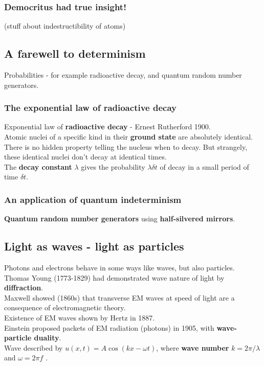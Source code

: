 \documentclass{article}
\begin{document}
\subsubsection{Democritus had true insight!}
(stuff about indestructibility of atoms)

\subsection{A farewell to determinism}
Probabilities - for example radioactive decay, and quantum random number generators.\\
\subsubsection{The exponential law of radioactive decay}
Exponential law of \textbf{radioactive decay} - Ernest Rutherford 1900.\\
Atomic nuclei of a specific kind in their \textbf{ground state} are absolutely identical. There is no hidden property telling the nucleus when to decay. But strangely, these identical nuclei don't decay at identical times.\\
The \textbf{decay constant} $\lambda$ gives the probability $\lambda \delta t$ of decay in a small period of time $\delta t$. \\
\subsubsection{An application of quantum indeterminism}
\textbf{Quantum random number generators} using \textbf{half-silvered mirrors}.

\subsection{Light as waves - light as particles}
Photons and electrons behave in some ways like waves, but also particles.\\
Thomas Young (1773-1829) had demonstrated wave nature of light by \textbf{diffraction}.\\
Maxwell showed (1860s) that transverse EM waves at speed of light are a consequence of electromagnetic theory.\\
Existence of EM waves shown by Hertz in 1887.\\
Einstein proposed packets of EM radiation (photons) in 1905, with \textbf{wave-particle duality}.\\
Wave described by $u(x,t) = A \cos (kx-\omega t)$, where \textbf{wave number} $k=2\pi/\lambda$ and $\omega = 2 \pi f$ . \\
\end{document}
